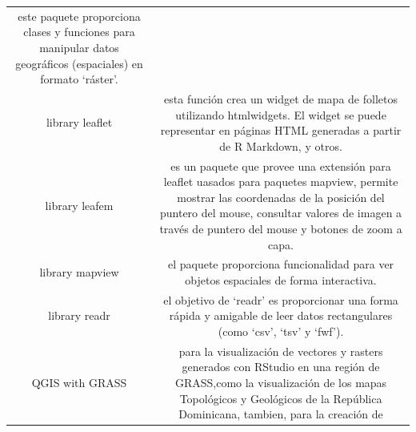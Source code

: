 \documentclass[11pt,]{article}
\begin{document}
\begin{longtable}[]{@{}cc@{}}
\begin{minipage}[t]{0.83\columnwidth}
este paquete proporciona clases y funciones para manipular datos
geográficos (espaciales) en formato `ráster'.\strut
\end{minipage}\tabularnewline
\begin{minipage}[t]{0.11\columnwidth}\centering\strut
library leaflet\strut
\end{minipage} & \begin{minipage}[t]{0.83\columnwidth}\centering\strut
esta función crea un widget de mapa de folletos utilizando htmlwidgets.
El widget se puede representar en páginas HTML generadas a partir de R
Markdown, y otros.\strut
\end{minipage}\tabularnewline
\begin{minipage}[t]{0.11\columnwidth}\centering\strut
library leafem\strut
\end{minipage} & \begin{minipage}[t]{0.83\columnwidth}\centering\strut
es un paquete que provee una extensión para leaflet uasados para
paquetes mapview, permite mostrar las coordenadas de la posición del
puntero del mouse, consultar valores de imagen a través de puntero del
mouse y botones de zoom a capa.\strut
\end{minipage}\tabularnewline
\begin{minipage}[t]{0.11\columnwidth}\centering\strut
library mapview\strut
\end{minipage} & \begin{minipage}[t]{0.83\columnwidth}\centering\strut
el paquete proporciona funcionalidad para ver objetos espaciales de
forma interactiva.\strut
\end{minipage}\tabularnewline
\begin{minipage}[t]{0.11\columnwidth}\centering\strut
library readr\strut
\end{minipage} & \begin{minipage}[t]{0.83\columnwidth}\centering\strut
el objetivo de `readr' es proporcionar una forma rápida y amigable de
leer datos rectangulares (como `csv', `tsv' y `fwf').\strut
\end{minipage}\tabularnewline
\begin{minipage}[t]{0.11\columnwidth}\centering\strut
QGIS with GRASS\strut
\end{minipage} & \begin{minipage}[t]{0.83\columnwidth}\centering\strut
para la visualización de vectores y rasters generados con RStudio en una
región de GRASS,como la visualización de los mapas Topológicos y
Geológicos de la República Dominicana, tambien, para la creación de

\end{minipage}
\end{longtable}
\end{document}
